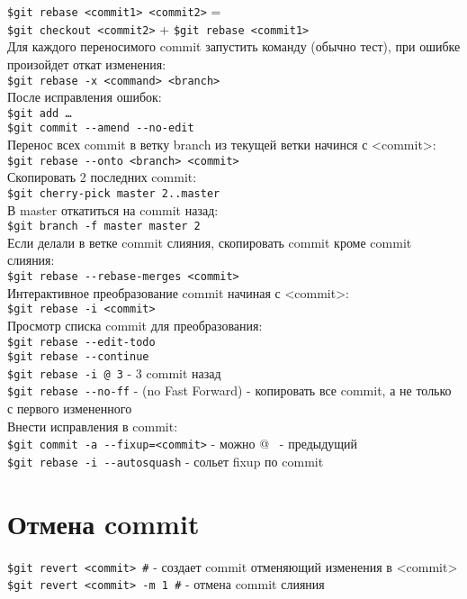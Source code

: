 \documentclass[12pt, a4paper]{article}
\begin{document}
\noindent\texttt{\$git rebase <commit1> <commit2>} = \\
\indent\indent \texttt{\$git checkout <commit2>} + \texttt{\$git rebase <commit1>} \\

\noindent Для каждого переносимого commit запустить команду (обычно тест), при ошибке произойдет откат изменения: \\
\indent\texttt{\$git rebase -x <command> <branch>} \\
\noindent После исправления ошибок: \\
\indent\texttt{\$git add \ldots} \\
\indent\texttt{\$git commit {-}-amend {-}-no-edit} \\

\noindent Перенос всех commit в ветку branch из текущей ветки начинся с <commit>: \\
\indent \texttt{\$git rebase {-}-onto <branch> <commit>}  \\

\noindent Скопировать 2 последних commit: \\
\indent \texttt{\$git cherry-pick master~2..master \indent} \\
\noindent В master откатиться на commit назад: \\
\indent \texttt{\$git branch -f master master~2} \\

\noindent Если делали в ветке commit слияния, скопировать commit кроме commit слияния: \\
\indent \texttt{\$git rebase {-}-rebase-merges <commit>} \\

\noindent Интерактивное преобразование commit начиная с <commit>: \\
\indent \texttt{\$git rebase -i <commit>}  \\
\noindent Просмотр списка commit для преобразования: \\
\indent \texttt{\$git rebase {-}-edit-todo}  \\

\noindent \texttt{\$git rebase {-}-continue} \\
\noindent \texttt{\$git rebase -i @~3} - 3 commit назад \\
\noindent \texttt{\$git rebase {-}-no-ff}  - (no Fast Forward) - копировать все commit, а не только с первого измененного \\

\noindent Внести исправления в commit: \\
\indent \texttt{\$git commit -a {-}-fixup=<commit>}   - можно @~ - предыдущий \\
\indent \texttt{\$git rebase -i {-}-autosquash} - сольет fixup по commit \\





\section{Отмена commit}
\texttt{\$git revert <commit> \#} - создает commit отменяющий изменения в <commit> \\
\texttt{\$git revert <commit> -m 1 \indent \#}  - отмена commit слияния \\

	
\end{document}

